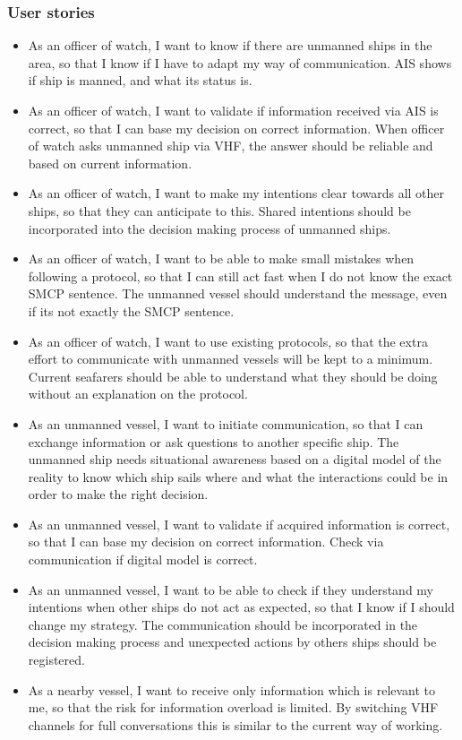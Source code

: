 \subsubsection{User stories}
\begin{itemize}
	\item As an officer of watch, I want to know if there are unmanned ships in the area, so that I know if I have to adapt my way of communication. \ac{AIS} shows if ship is manned, and what its status is.
	
	\item As an officer of watch, I want to validate if information received via \ac{AIS} is correct, so that I can base my decision on correct information. When officer of watch asks unmanned ship via \ac{VHF}, the answer should be reliable and based on current information.
	
	\item As an officer of watch, I want to make my intentions clear towards all other ships, so that they can anticipate to this. Shared intentions should be incorporated into the decision making process of unmanned ships.
	
	\item As an officer of watch, I want to be able to make small mistakes when following a protocol, so that I can still act fast when I do not know the exact \ac{SMCP} sentence. The unmanned vessel should understand the message, even if its not exactly the \ac{SMCP} sentence.
	
	\item As an officer of watch, I want to use existing protocols, so that the extra effort to communicate with unmanned vessels will be kept to a minimum. Current seafarers should be able to understand what they should be doing without an explanation on the protocol. 
	
	\item As an unmanned vessel, I want to initiate communication, so that I can exchange information or ask questions to another specific ship. The unmanned ship needs situational awareness based on a digital model of the reality to know which ship sails where and what the interactions could be in order to make the right decision.
	
	\item As an unmanned vessel, I want to validate if acquired information is correct, so that I can base my decision on correct information. Check via communication if digital model is correct.
	
	\item As an unmanned vessel, I want to be able to check if they understand my intentions when other ships do not act as expected, so that I know if I should change my strategy. The communication should be incorporated in the decision making process and unexpected actions by others ships should be registered.
	
	\item As a nearby vessel, I want to receive only information which is relevant to me, so that the risk for information overload is limited. By switching \ac{VHF} channels for full conversations this is similar to the current way of working.
\end{itemize}

